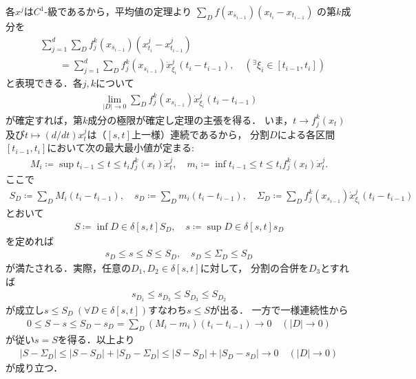 	\begin{prf}
		各$x^j$は$C^1$-級であるから，平均値の定理より
		$\sum_{D} f(x_{s_{i-1}})(x_{t_i} - x_{t_{i-1}})$
		の第$k$成分を
		\begin{align}
			&\sum_{j=1}^{d} \sum_{D} f^k_j (x_{s_{i-1}})(x^j_{t_i} - x^j_{t_{i-1}}) 
				\label{eq:thm_existence_of_Riemann_Stieltjes_integral}\\
			&\qquad 
			= \sum_{j=1}^{d} \sum_{D} f^k_j (x_{s_{i-1}}) \dot{x}^j_{\xi_i}(t_i - t_{i-1}),
			\quad ({}^\exists \xi_i \in [t_{i-1},t_i])
		\end{align}
		と表現できる．各$j,k$について
		\begin{align}
			\lim_{|D| \to 0} \sum_{D} f^k_j (x_{s_{i-1}}) \dot{x}^j_{\xi_i}(t_i - t_{i-1})
		\end{align}
		が確定すれば，第$k$成分の極限が確定し定理の主張を得る．
		いま，$t \longrightarrow f^k_j(x_t)$及び$t \longmapsto (d/dt)x^j_t$は（$[s,t]$上一様）連続であるから，
		分割$D$による各区間$[t_{i-1},t_i]$において次の最大最小値が定まる:
		\begin{align}
			M_i \coloneqq \sup{t_{i-1} \leq t \leq t_i} f^k_j(x_t)\dot{x}^j_t,
			\quad m_i \coloneqq \inf{t_{i-1} \leq t \leq t_i} f^k_j(x_t)\dot{x}^j_t.
		\end{align}
		ここで
		\begin{align}
			S_D \coloneqq \sum_{D} M_i(t_i - t_{i-1}),
			\quad s_D \coloneqq \sum_{D} m_i(t_i - t_{i-1}),
			\quad \Sigma_D \coloneqq \sum_{D} f^k_j (x_{s_{i-1}}) \dot{x}^j_{\xi_i}(t_i - t_{i-1})
		\end{align}
		とおいて
		\begin{align}
			S \coloneqq \inf{D \in \delta[s,t]}{S_D},
			\quad s \coloneqq \sup{D \in \delta[s,t]}{s_D}
		\end{align}
		を定めれば
		\begin{align}
			s_D \leq s \leq S \leq S_D,
			\quad s_D \leq \Sigma_D \leq S_D
		\end{align}
		が満たされる．実際，任意の$D_1,D_2 \in \delta[s,t]$に対して，
		分割の合併を$D_3$とすれば
		\begin{align}
			s_{D_1} \leq s_{D_3} \leq S_{D_3} \leq S_{D_2}
		\end{align}
		が成立し$s \leq S_D\ (\forall D \in \delta[s,t])$すなわち$s \leq S$が出る．
		一方で一様連続性から
		\begin{align}
			0 \leq S - s \leq S_D - s_D = \sum_D (M_i - m_i)(t_i - t_{i-1})
			\longrightarrow 0
			\quad (|D| \longrightarrow 0)
		\end{align}
		が従い$s = S$を得る．以上より
		\begin{align}
			|S - \Sigma_D| \leq |S - S_D| + |S_D - \Sigma_D|
			\leq |S - S_D| + |S_D - s_D|
			\longrightarrow 0
			\quad (|D| \longrightarrow 0)
		\end{align}
		が成り立つ．
		\QED
\end{prf}

